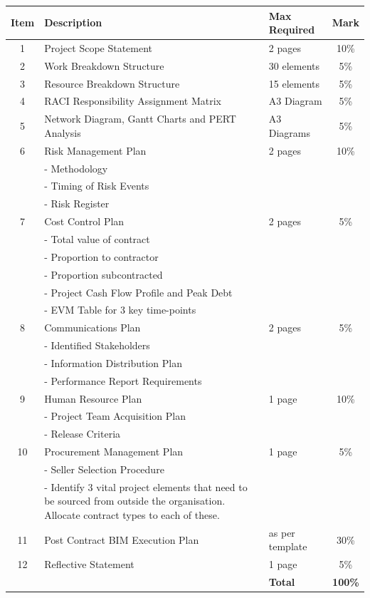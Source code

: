\begin{tabularx}{\textwidth}{ |c|X|l|c| }
		\hline
		\textbf{Item} & \textbf{Description} & \textbf{Max Required} & \textbf{Mark} \\
		\hline
		\hline
		1  & Project Scope Statement &  2 pages  & 10\% \\
		\hline
		2  & Work Breakdown Structure &  30 elements  & 5\% \\
		\hline
		3  & Resource Breakdown Structure &  15 elements  & 5\% \\
		\hline
		4  & RACI Responsibility Assignment Matrix &  A3 Diagram  & 5\% \\
		\hline
		5  & Network Diagram, Gantt Charts and PERT Analysis &  A3 Diagrams  & 5\% \\
		\hline
		6  & Risk Management Plan & 2 pages  & 10\% \\
		&	- Methodology  & & \\
		&	- Timing of Risk Events  & & \\
		&	- Risk Register  & & \\
		\hline
		7  & Cost Control Plan &  2 pages  & 5\% \\
		&	- Total value of contract  & & \\
		&	- Proportion to contractor  & & \\
		&	- Proportion subcontracted   & & \\
		&	- Project Cash Flow Profile and Peak Debt  & & \\
		&	- EVM Table for 3 key time-points  & & \\
		\hline
		8  & Communications Plan &  2 pages  & 5\% \\
		&	- Identified Stakeholders  & & \\
		&	- Information Distribution Plan  & & \\
		&	- Performance Report Requirements  & & \\
		\hline
		9  & Human Resource Plan &  1 page  & 10\% \\
		&	- Project Team Acquisition Plan & & \\
		&	- Release Criteria  & & \\
		\hline
		10  & Procurement Management Plan &  1 page  & 5\% \\
		&	- Seller Selection Procedure  & & \\
		&	- Identify 3 vital project elements that need to be sourced from outside the organisation.  Allocate contract types to each of these.  & & \\
		\hline
		11  & Post Contract BIM Execution Plan &  as per template  & 30\% \\
		\hline
		12  & Reflective Statement &  1 page  & 5\% \\
		\hline
		\hline
		& & \textbf{Total} & \textbf{100\%} \\
		\hline
\end{tabularx}










